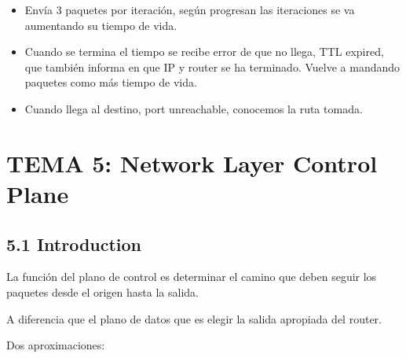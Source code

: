 \documentclass[12pt, twoside, openright]{report} %
\begin{document}
\begin{itemize}
\begin{itemize}
		            \begin{itemize}
			            \item Envía 3 paquetes por iteración, según progresan las iteraciones
			                  se va aumentando su tiempo de vida.
			            \item Cuando se termina el tiempo se recibe error de que no llega, TTL
			                  expired, que también informa en que IP y router se ha terminado.
			                  Vuelve a mandando paquetes como más tiempo de vida.
			            \item Cuando llega al destino, port unreachable, conocemos la ruta
			                  tomada.
		            \end{itemize}
	      \end{itemize}
\end{itemize}

\chapter{TEMA 5: Network Layer Control Plane}

\section{5.1 Introduction}



La función del plano de control es determinar el camino que deben
seguir los paquetes desde el origen hasta la salida.

A diferencia que el plano de datos que es elegir la salida apropiada
del router.

Dos aproximaciones:
\end{document}
